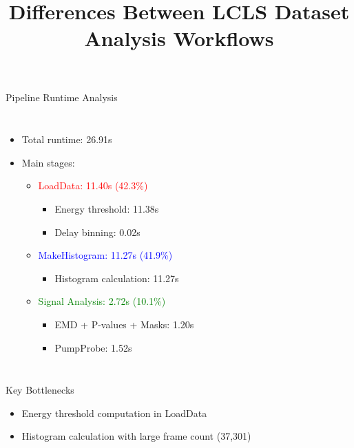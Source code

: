 \documentclass{beamer}
\title{Differences Between LCLS Dataset Analysis Workflows}
\begin{document}

\begin{frame}{Pipeline Runtime Analysis}
\begin{columns}
\begin{itemize}
\item Total runtime: 26.91s
\item Main stages:
    \begin{itemize}
    \item \textcolor{red}{LoadData: 11.40s (42.3\%)}
        \begin{itemize}
        \item Energy threshold: 11.38s
        \item Delay binning: 0.02s
        \end{itemize}
    \item \textcolor{blue}{MakeHistogram: 11.27s (41.9\%)}
        \begin{itemize}
        \item Histogram calculation: 11.27s
        \end{itemize}
    \item \textcolor{green}{Signal Analysis: 2.72s (10.1\%)}
        \begin{itemize}
        \item EMD + P-values + Masks: 1.20s
        \item PumpProbe: 1.52s
        \end{itemize}
    \end{itemize}
\end{itemize}

\end{columns}

\vspace{0.3cm}
\begin{block}{Key Bottlenecks}
\begin{itemize}
\item Energy threshold computation in LoadData
\item Histogram calculation with large frame count (37,301)
\end{itemize}
\end{block}
\end{frame}
\end{document}

